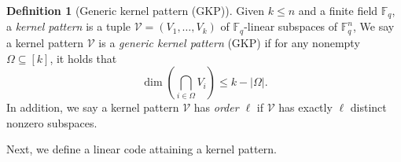 \documentclass[11pt]{article}
\theoremstyle{plain}
\theoremstyle{definition}
\newtheorem{defn}[thm]{Definition}
\theoremstyle{remark}
\newcommand{\F}{\mathbb{F}}
\newcommand{\vm}{\bm{m}}
\begin{document}
\begin{defn}[Generic kernel pattern (GKP)]\label{def:GKP}
Given $k\leq n$ and a finite field $\F_q$, a \emph{kernel pattern} 
is a tuple $\mathcal{V}=(V_1,\ldots,V_k)$ of $\F_q$-linear subspaces of $\F_q^n$,
We say a kernel pattern $\mathcal{V}$ is a \emph{generic kernel pattern} (GKP) if for any nonempty $\Omega\subseteq [k]$, it holds that
\begin{equation}
\dim\left(\bigcap_{i\in \Omega} V_i\right)\leq k-|\Omega|.
\end{equation}
In addition, we say a kernel pattern $\mathcal{V}$ has \emph{order $\ell$} if $\mathcal{V}$ has exactly $\ell$ distinct nonzero subspaces. 
\end{defn}


Next, we define a linear code attaining a kernel pattern.
\end{document}
